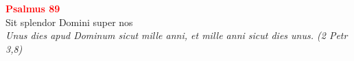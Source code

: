 


\def\greinitialformat#1{%
{\fontsize{39}{39}\selectfont #1}%
}




\vspace{0.3cm}
\begin{center}
 \textcolor{red}{\large \bf Psalmus 89}\\
Sit splendor Domini super nos\\
\textit{\small Unus dies apud Dominum sicut mille anni, et mille anni sicut dies unus. (2 Petr 3,8)}
\end{center}
